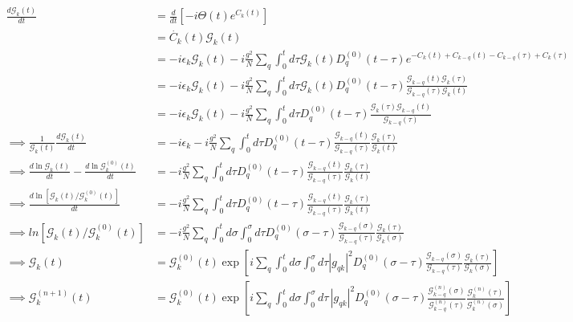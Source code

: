 \begin{align}
\frac{d \mathcal{G}_k(t)}{d t}&= \frac{d}{d t}\left[-i \Theta(t) e^{C_k(t)}\right] \\
&= \dot{C_k}(t) \mathcal{G}_k(t) \\
&= -i \epsilon_k \mathcal{G}_k(t) - i \frac{g^2}{N} \sum_q \int_0^t d \tau \mathcal{G}_k(t) D_q^{(0)}(t-\tau) e^{-C_k(t)+C_{k-q}(t)-C_{k-q}(\tau)+C_k(\tau)} \\
&= -i \epsilon_k \mathcal{G}_k(t) - i \frac{g^2}{N} \sum_q \int_0^t d \tau \mathcal{G}_k(t) D_q^{(0)}(t-\tau) \frac{\mathcal{G}_{k-q}(t) \mathcal{G}_k(\tau)}{\mathcal{G}_{k-q}(\tau) \mathcal{G}_k(t)} \\
&=-i \epsilon_k \mathcal{G}_k(t) - i \frac{g^2}{N} \sum_q \int_0^t d \tau D_q^{(0)}(t-\tau) \frac{\mathcal{G}_k(\tau) \mathcal{G}_{k-q}(t)}{\mathcal{G}_{k-q}(\tau)}\\
\implies \frac{1}{\mathcal{G}_k(t)} \frac{d \mathcal{G}_k(t)}{d t}&={-i \epsilon_k} - i \frac{g^2}{N} \sum_q \int_0^t d \tau D_q^{(0)}(t-\tau) \frac{\mathcal{G}_{k-q}(t)}{\mathcal{G}_{k-q}(\tau)} \frac{\mathcal{G}_k(\tau)}{\mathcal{G}_k(t)} \label{a8} \\
\implies \frac{d \ln \mathcal{G}_k(t)}{d t}-\frac{d \ln \mathcal{G}_k^{(0)}(t)}{d t}&=- i \frac{g^2}{N} \sum_q \int_0^t d \tau D_q^{(0)}(t-\tau) \frac{\mathcal{G}_{k-q}(t)}{\mathcal{G}_{k-q}(\tau)} \frac{\mathcal{G}_k(\tau)}{\mathcal{G}_k(t)} \\
\implies \frac{d \ln \left[\mathcal{G}_k(t) / \mathcal{G}_k^{(0)}(t)\right]}{d t}&=- i \frac{g^2}{N} \sum_q \int_0^t d \tau D_q^{(0)}(t-\tau) \frac{\mathcal{G}_{k-q}(t)}{\mathcal{G}_{k-q}(\tau)} \frac{\mathcal{G}_k(\tau)}{\mathcal{G}_k(t)} \\
\implies ln \left[\mathcal{G}_k(t) / \mathcal{G}_k^{(0)}(t)\right] &=- i \frac{g^2}{N} \sum_q \int_0^t d \sigma \int_0^\sigma d \tau D_q^{(0)}(\sigma-\tau) \frac{\mathcal{G}_{k-q}(\sigma)}{\mathcal{G}_{k-q}(\tau)} \frac{\mathcal{G}_k(\tau)}{\mathcal{G}_k(\sigma)} \\
\implies \mathcal{G}_k(t) &=\mathcal{G}_k^{(0)}(t) \exp \left[i \sum_q \int_0^t d \sigma \int_0^\sigma d \tau\left|g_{q k}\right|^2 D_q^{(0)}(\sigma-\tau) \frac{\mathcal{G}_{k-q}(\sigma)}{\mathcal{G}_{k-q}(\tau)} \frac{\mathcal{G}_k(\tau)}{\mathcal{G}_k(\sigma)}\right] \\
\implies \mathcal{G}_k^{(n+1)}(t)
&=\mathcal{G}_k^{(0)}(t)
\exp\!\left[
i\!\sum_q
\int_0^t d\sigma\!\!\int_0^\sigma d\tau\,
\left|g_{q k}\right|^2 D_q^{(0)}(\sigma\!-\!\tau)
\frac{\mathcal{G}_{k-q}^{(n)}(\sigma)}{\mathcal{G}_{k-q}^{(n)}(\tau)}
\frac{\mathcal{G}_k^{(n)}(\tau)}{\mathcal{G}_k^{(n)}(\sigma)}
\right]
\end{align}
